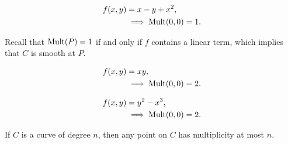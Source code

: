 \begin{align*}
    f(x,y) &= x - y + x^2,\\
    &\implies \mathrm{Mult}(0,0) = 1.
\end{align*}

Recall that $\mathrm{Mult}(P) = 1$ if and only if $f$ contains a linear term, which implies that $C$ is smooth at $P$.

\begin{align*}
    f(x,y) &= xy,\\
    &\implies \mathrm{Mult}(0,0) = 2.
\end{align*}

\begin{align*}
    f(x,y) &= y^2 - x^3,\\
    &\implies \mathrm{Mult}(0,0) = 2.
\end{align*}

If $C$ is a curve of degree $n$, then any point on $C$ has multiplicity at most $n$.